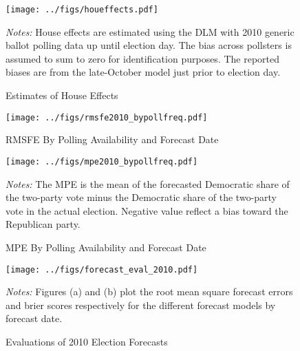 \documentclass[12pt,final,fleqn]{article}
\theoremstyle{plain}
\begin{document}
\begin{figure}[!htb]
\begin{center}
\texttt{[image: ../figs/houeffects.pdf]}
\vspace{.5cm}
\caption{Estimates of House Effects}
\label{fig:Estimates of House Effects}
\begin{minipage}{\linewidth}
\footnotesize
\emph{Notes:} House effects are estimated using the DLM with 2010 generic ballot polling data up until election day. The bias across pollsters is assumed to sum to zero for identification purposes. The reported biases are from the late-October model just prior to election day.
\end{minipage}
\end{center}
\end{figure}

\begin{figure}[!htb]
\begin{center}
\texttt{[image: ../figs/rmsfe2010\_bypollfreq.pdf]}
\vspace{.5cm}
\caption{RMSFE By Polling Availability and Forecast Date}
\label{fig:RMSFE By Polling Availability and Forecast Date}
\begin{minipage}{\linewidth}
\footnotesize
\end{minipage}
\end{center}
\end{figure}

\begin{figure}[!htb]
\begin{center}
\texttt{[image: ../figs/mpe2010\_bypollfreq.pdf]}
\vspace{.5cm}
\caption{MPE By Polling Availability and Forecast Date}
\label{fig:MPE By Polling Availability and Forecast Date}
\begin{minipage}{\linewidth}
\footnotesize
\emph{Notes:} The MPE is the mean of the forecasted Democratic share of the two-party vote minus the Democratic share of the two-party vote in the actual election. Negative value reflect a bias toward the Republican party.
\end{minipage}
\end{center}
\end{figure}

\begin{figure}[!htb]
\centering
\texttt{[image: ../figs/forecast\_eval\_2010.pdf]}
\vspace{.5cm}
\caption{Evaluations of 2010 Election Forecasts}
\label{fig:Evaluations of 2010 Election Forecasts}
\begin{minipage}{\linewidth}
\footnotesize
\emph{Notes:} Figures (a) and (b) plot the root mean square forecast errors and brier scores respectively for the different forecast models by forecast date. 
\end{minipage}
\end{figure}
\end{document}
